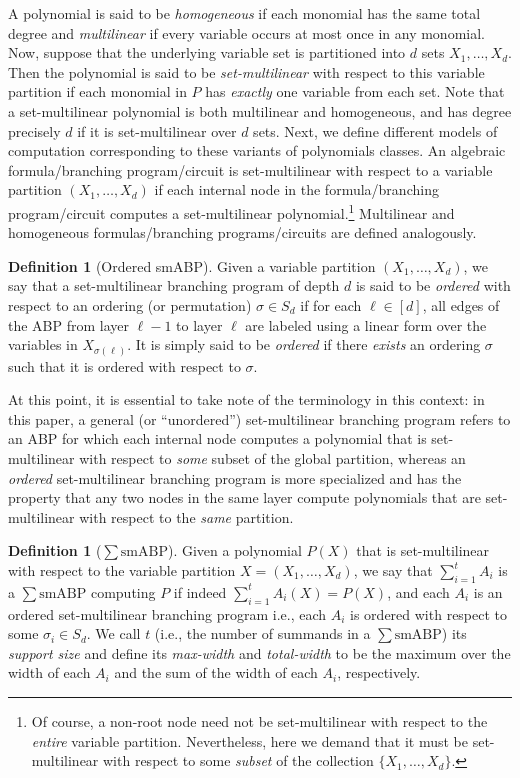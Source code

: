 \documentclass[10pt,a4paper]{article}
\theoremstyle{definition}%
\newtheorem{definition}[theorem]{Definition}
\theoremstyle{plain}
\newcommand{\sbp}{\sum\mathrm{smABP}}
\begin{document}
A polynomial is said to be \emph{homogeneous}
if each monomial has the same total degree and \emph{multilinear} if every variable occurs
at most once in any monomial. Now, suppose that the underlying variable set is partitioned into $d$ sets
$X_1,\ldots, X_d$. Then the polynomial is said to be \emph{set-multilinear} with respect to this variable partition if each
monomial in $P$ has \emph{exactly} one variable from each set. Note that a set-multilinear polynomial is both multilinear and homogeneous, and has degree precisely $d$ if it is set-multilinear over $d$ sets. Next, we define different models
of computation corresponding to these variants of polynomials classes. An algebraic formula/branching program/circuit is set-multilinear with respect to a variable partition
$(X_1,\ldots, X_d)$ if each internal node in the formula/branching program/circuit computes a set-multilinear polynomial.\footnote{Of course, a non-root node need not be set-multilinear with respect to the \emph{entire} variable partition. Nevertheless, here we demand that it must be set-multilinear with respect to some \emph{subset} of the collection $\{X_1,\ldots,X_d\}$.} Multilinear and homogeneous formulas/branching programs/circuits are defined analogously.  

\begin{definition}[Ordered smABP]\label{def:smABP}
Given a variable partition $(X_1,\ldots, X_d)$, we say that a set-multilinear branching program of depth $d$ is said to be \emph{ordered} with respect to an 
ordering (or permutation) $\sigma\in S_d$ if for each $\ell\in[d]$, all edges of the ABP from layer $\ell-1$ to layer $\ell$ are labeled using a linear form over the variables in $X_{\sigma(\ell)}$. It is simply said to be \emph{ordered} if there \emph{exists} an ordering $\sigma$ such that it is ordered with respect to $\sigma$.
\end{definition}

At this point, it is essential to take note of the terminology in this context: in this paper, a general (or ``unordered'') set-multilinear branching program refers to an ABP for which each internal node computes a polynomial that is set-multilinear with respect to \emph{some} subset of the global partition, whereas an \emph{ordered} set-multilinear branching program is more specialized and has the property that any two nodes in the same layer compute polynomials that are set-multilinear with respect to the \emph{same} partition.

\begin{definition}[$\sbp$]\label{def:sum}
Given a polynomial $P(X)$ that is set-multilinear with respect to the variable partition $X = (X_1,\ldots, X_d)$, we say that $\sum_{i=1}^t A_i$ is a $\sbp$ computing $P$ if indeed $\sum_{i=1}^t A_i(X) = P(X)$, and
each $A_i$ is an ordered set-multilinear branching program i.e., each $A_i$ is ordered with respect to some $\sigma_i\in S_d$. We call $t$ (i.e., the number of summands in a $\sbp$) its \emph{support size} and define its \emph{max-width} and \emph{total-width} to be the maximum over the width of each $A_i$ and the sum of the width of each $A_i$, respectively.    
\end{definition}
\end{document}
